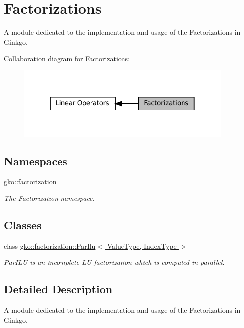 \hypertarget{group__factor}{}\section{Factorizations}
\label{group__factor}


A module dedicated to the implementation and usage of the Factorizations in Ginkgo.  


Collaboration diagram for Factorizations\+:
\nopagebreak
\begin{figure}[H]
\begin{center}
\leavevmode
\includegraphics[width=298pt]{group__factor}
\end{center}
\end{figure}
\subsection*{Namespaces}
\begin{DoxyCompactItemize}
\item 
 \hyperlink{namespacegko_1_1factorization}{gko\+::factorization}
\begin{DoxyCompactList}\small\item\em The Factorization namespace. \end{DoxyCompactList}\end{DoxyCompactItemize}
\subsection*{Classes}
\begin{DoxyCompactItemize}
\item 
class \hyperlink{classgko_1_1factorization_1_1ParIlu}{gko\+::factorization\+::\+Par\+Ilu$<$ Value\+Type, Index\+Type $>$}
\begin{DoxyCompactList}\small\item\em Par\+I\+LU is an incomplete LU factorization which is computed in parallel. \end{DoxyCompactList}\end{DoxyCompactItemize}


\subsection{Detailed Description}
A module dedicated to the implementation and usage of the Factorizations in Ginkgo. 

